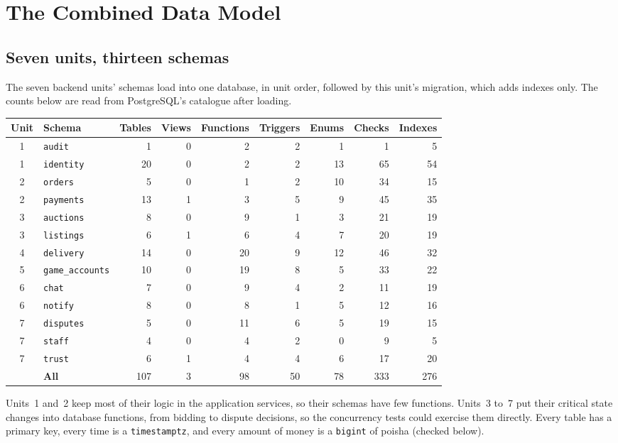 \documentclass[11pt,a4paper]{article}
\newenvironment{dtable}[1]{\small\begin{longtable}{#1}}{\end{longtable}}
\begin{document}
\section{The Combined Data Model}
\label{sec:data}

\subsection{Seven units, thirteen schemas}
The seven backend units' schemas load into one database, in unit order, followed by this unit's migration, which adds indexes only. The counts below are read from PostgreSQL's catalogue after loading.
\begin{dtable}{@{}c>{\raggedright\arraybackslash}p{2.6cm}rrrrrrr@{}}
\toprule
\textbf{Unit} & \textbf{Schema} & \textbf{Tables} & \textbf{Views} & \textbf{Functions} & \textbf{Triggers} & \textbf{Enums} & \textbf{Checks} & \textbf{Indexes} \\ \midrule \endhead
1 & \texttt{audit} & 1 & 0 & 2 & 2 & 1 & 1 & 5 \\
1 & \texttt{identity} & 20 & 0 & 2 & 2 & 13 & 65 & 54 \\
2 & \texttt{orders} & 5 & 0 & 1 & 2 & 10 & 34 & 15 \\
2 & \texttt{payments} & 13 & 1 & 3 & 5 & 9 & 45 & 35 \\
3 & \texttt{auctions} & 8 & 0 & 9 & 1 & 3 & 21 & 19 \\
3 & \texttt{listings} & 6 & 1 & 6 & 4 & 7 & 20 & 19 \\
4 & \texttt{delivery} & 14 & 0 & 20 & 9 & 12 & 46 & 32 \\
5 & \texttt{game\_accounts} & 10 & 0 & 19 & 8 & 5 & 33 & 22 \\
6 & \texttt{chat} & 7 & 0 & 9 & 4 & 2 & 11 & 19 \\
6 & \texttt{notify} & 8 & 0 & 8 & 1 & 5 & 12 & 16 \\
7 & \texttt{disputes} & 5 & 0 & 11 & 6 & 5 & 19 & 15 \\
7 & \texttt{staff} & 4 & 0 & 4 & 2 & 0 & 9 & 5 \\
7 & \texttt{trust} & 6 & 1 & 4 & 4 & 6 & 17 & 20 \\
\midrule
& \textbf{All} & 107 & 3 & 98 & 50 & 78 & 333 & 276 \\
\bottomrule
\end{dtable}
Units~1 and~2 keep most of their logic in the application services, so their schemas have few functions. Units~3 to~7 put their critical state changes into database functions, from bidding to dispute decisions, so the concurrency tests could exercise them directly. Every table has a primary key, every time is a \texttt{timestamptz}, and every amount of money is a \texttt{bigint} of poisha (checked below).
\end{document}
